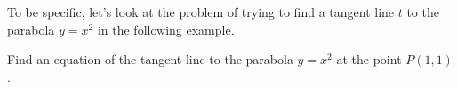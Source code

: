 \documentclass{sebase}
\begin{document}
To be specific, let's look at the problem of trying to find a tangent line $%
t $ to the parabola $y=x^{2}$ in the following example.%
\enlargethispage{\baselineskip}%

\begin{Example}[1]
\VIDEO%
%
Find an equation of the tangent line to the parabola $y=x^{2}$ at the point $%
P(1,1)$.
\end{Example}
\end{document}
